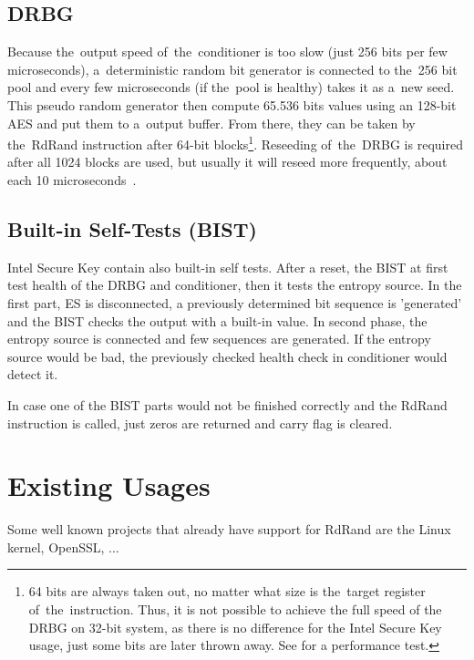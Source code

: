 \subsection{DRBG}\label{subsec:DRBG}
Because the~output speed of~the~conditioner is too slow (just 256 bits per few microseconds), 
a~deterministic random bit generator is connected to the~256 bit pool 
and every few microseconds (if the~pool is healthy) takes it as a~new seed. 
This pseudo random generator then compute 65.536 bits values using an 128-bit AES 
and put them to a~output buffer. 
From there, they can be taken by the~RdRand instruction after 64-bit blocks\footnote{64 bits 
	are always taken out, no matter what size is the~target register of~the~instruction. 
	Thus, it is not possible to achieve the full speed of the DRBG on 32-bit system, 
	as there is no difference for the Intel Secure Key usage, 
	just some bits are later thrown away. See  
	for a performance test.}\cite{AnalysisOfDRNG,UnderstandingRdRandElectronic}. 
Reseeding of~the~DRBG is required after all 1024 blocks are used, 
but usually it will reseed more frequently, 
about each 10 microseconds~\cite[Chapter~4.4]{IntelDRNGGuide}.

\subsection{Built-in Self-Tests (BIST)}
Intel Secure Key contain also built-in self tests. After a reset, the BIST at first test health of the DRBG and conditioner, then it tests the entropy source. In the first part, ES is disconnected, a previously determined bit sequence is 'generated' and the BIST checks the output with a built-in value. In second phase, the entropy source is connected and few sequences are generated. If the entropy source would be bad, the previously checked health check in conditioner would detect it. 

In case one of the BIST parts would not be finished correctly and the RdRand instruction is called, just zeros are returned and carry flag is cleared\cite{AnalysisOfDRNG}.

\section{Existing Usages} 
Some well known projects that already have support for RdRand are the Linux kernel, OpenSSL, ...


